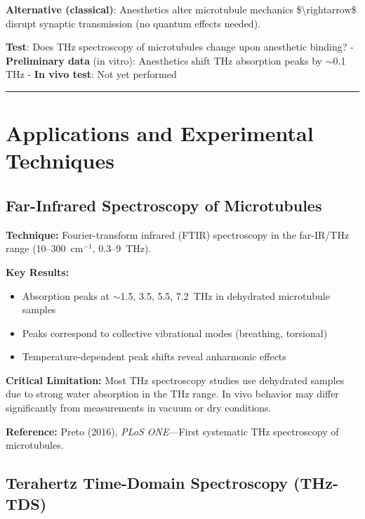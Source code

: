 \textbf{Alternative (classical)}: Anesthetics alter microtubule
mechanics \$\textbackslash rightarrow\$ disrupt synaptic transmission
(no quantum effects needed).

\textbf{Test}: Does THz spectroscopy of microtubules change upon
anesthetic binding? - \textbf{Preliminary data} (in vitro): Anesthetics
shift THz absorption peaks by $\sim$0.1 THz - \textbf{In vivo
test}: Not yet performed

\begin{center}\rule{0.5\linewidth}{0.5pt}\end{center}


\section{Applications and Experimental Techniques}
\label{sec:applications}

\subsection{Far-Infrared Spectroscopy of Microtubules}
\label{subsec:app-ftir}

\textbf{Technique:} Fourier-transform infrared (FTIR) spectroscopy in the far-IR/THz range (10--300~cm$^{-1}$, 0.3--9~THz).

\textbf{Key Results:}
\begin{itemize}
\item Absorption peaks at $\sim$1.5, 3.5, 5.5, 7.2~THz in dehydrated microtubule samples
\item Peaks correspond to collective vibrational modes (breathing, torsional)
\item Temperature-dependent peak shifts reveal anharmonic effects
\end{itemize}

\begin{warningbox}
\textbf{Critical Limitation:} Most THz spectroscopy studies use dehydrated samples due to strong water absorption in the THz range. In vivo behavior may differ significantly from measurements in vacuum or dry conditions.
\end{warningbox}

\textbf{Reference:} Preto (2016), \textit{PLoS ONE}---First systematic THz spectroscopy of microtubules.

\subsection{Terahertz Time-Domain Spectroscopy (THz-TDS)}
\label{subsec:app-thz-tds}

